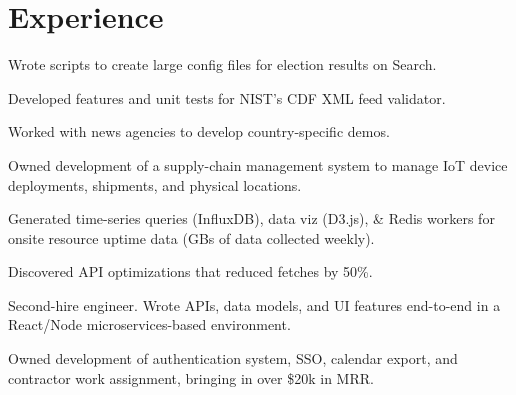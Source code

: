 \documentclass[]{deedy-resume-openfont}
\begin{document}
\hfill
\begin{minipage}[t]{0.66\textwidth}


\section{Experience}
\sectionsep

\vspace{\topsep}
\begin{tightemize}

\item Wrote scripts to create large config files for election results on Search.
\item Developed features and unit tests for NIST's CDF XML feed validator.
\item Worked with news agencies to develop country-specific demos.

\end{tightemize}
\sectionsep

\begin{tightemize}

\item Owned development of a supply-chain management system to manage IoT device deployments, shipments, and physical locations.
\item Generated time-series queries (InfluxDB), data viz (D3.js), \& Redis workers for onsite resource uptime data (GBs of data collected weekly).
\item Discovered API optimizations that reduced fetches by 50\%.

\end{tightemize}
\sectionsep


\begin{tightemize}

\item Second-hire engineer. Wrote APIs, data models, and UI features end-to-end in a React/Node microservices-based environment.
\item Owned development of authentication system, SSO, calendar export, and contractor work assignment, bringing in over \$20k in MRR.


\end{tightemize}
\end{minipage}
\end{document}
